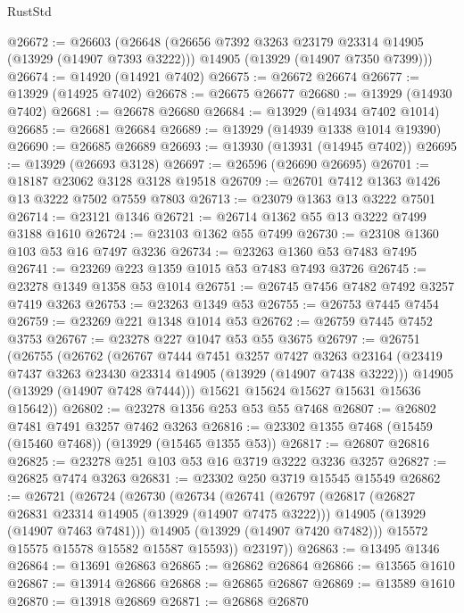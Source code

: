 \begin{lexlean}{RustStd}
\begin{coremodule}
@26672 := @26603
    (@26648
      (@26656 @7392 @3263 @23179 @23314 @14905 (@13929 (@14907 @7393 @3222)))
      @14905
      (@13929 (@14907 @7350 @7399)))
@26674 := @14920 (@14921 @7402)
@26675 := @26672 @26674
@26677 := @13929 (@14925 @7402)
@26678 := @26675 @26677
@26680 := @13929 (@14930 @7402)
@26681 := @26678 @26680
@26684 := @13929 (@14934 @7402 @1014)
@26685 := @26681 @26684
@26689 := @13929 (@14939 @1338 @1014 @19390)
@26690 := @26685 @26689
@26693 := @13930 (@13931 (@14945 @7402))
@26695 := @13929 (@26693 @3128)
@26697 := @26596 (@26690 @26695)
@26701 := @18187 @23062 @3128 @3128 @19518
@26709 := @26701 @7412 @1363 @1426 @13 @3222 @7502 @7559 @7803
@26713 := @23079 @1363 @13 @3222 @7501
@26714 := @23121 @1346
@26721 := @26714 @1362 @55 @13 @3222 @7499 @3188 @1610
@26724 := @23103 @1362 @55 @7499
@26730 := @23108 @1360 @103 @53 @16 @7497 @3236
@26734 := @23263 @1360 @53 @7483 @7495
@26741 := @23269 @223 @1359 @1015 @53 @7483 @7493 @3726
@26745 := @23278 @1349 @1358 @53 @1014
@26751 := @26745 @7456 @7482 @7492 @3257 @7419 @3263
@26753 := @23263 @1349 @53
@26755 := @26753 @7445 @7454
@26759 := @23269 @221 @1348 @1014 @53
@26762 := @26759 @7445 @7452 @3753
@26767 := @23278 @227 @1047 @53 @55 @3675
@26797 := @26751
    (@26755
      (@26762
        (@26767
          @7444
          @7451
          @3257
          @7427
          @3263
          @23164
          (@23419 @7437 @3263 @23430 @23314 @14905 (@13929 (@14907 @7438 @3222)))
          @14905
          (@13929 (@14907 @7428 @7444)))
        @15621
        @15624
        @15627
        @15631
        @15636
        @15642))
@26802 := @23278 @1356 @253 @53 @55 @7468
@26807 := @26802 @7481 @7491 @3257 @7462 @3263
@26816 := @23302 @1355 @7468 (@15459 (@15460 @7468)) (@13929 (@15465 @1355 @53))
@26817 := @26807 @26816
@26825 := @23278 @251 @103 @53 @16 @3719 @3222 @3236 @3257
@26827 := @26825 @7474 @3263
@26831 := @23302 @250 @3719 @15545 @15549
@26862 := @26721
    (@26724
      (@26730
        (@26734
          (@26741
            (@26797
              (@26817
                (@26827 @26831 @23314 @14905 (@13929 (@14907 @7475 @3222)))
                @14905
                (@13929 (@14907 @7463 @7481)))
              @14905
              (@13929 (@14907 @7420 @7482)))
            @15572
            @15575
            @15578
            @15582
            @15587
            @15593))
        @23197))
@26863 := @13495 @1346
@26864 := @13691 @26863
@26865 := @26862 @26864
@26866 := @13565 @1610
@26867 := @13914 @26866
@26868 := @26865 @26867
@26869 := @13589 @1610
@26870 := @13918 @26869
@26871 := @26868 @26870

\end{coremodule}
\end{lexlean}
